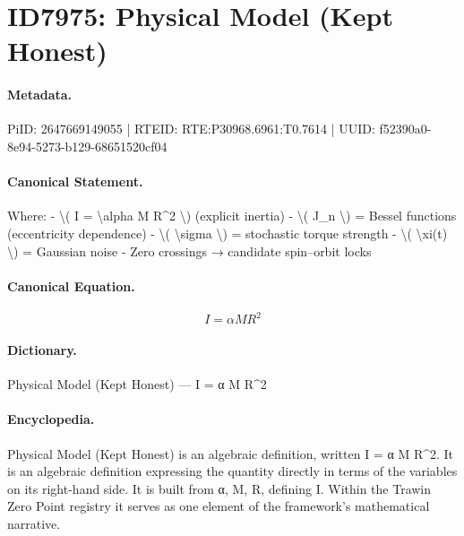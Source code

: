 \section*{ID7975: Physical Model (Kept Honest)}
\paragraph{Metadata.}
PiID: 2647669149055 | RTEID: RTE:P30968.6961:T0.7614 | UUID: f52390a0-8e94-5273-b129-68651520cf04

\paragraph{Canonical Statement.}
Where: - \textbackslash{}( I = \textbackslash{}alpha M R\textasciicircum{}2 \textbackslash{}) (explicit inertia) - \textbackslash{}( J\_n \textbackslash{}) = Bessel functions (eccentricity dependence) - \textbackslash{}( \textbackslash{}sigma \textbackslash{}) = stochastic torque strength - \textbackslash{}( \textbackslash{}xi(t) \textbackslash{}) = Gaussian noise - Zero crossings → candidate spin–orbit locks

\paragraph{Canonical Equation.}
\[
I = \alpha M R^2
\]

\paragraph{Dictionary.}
Physical Model (Kept Honest) — I = α M R\textasciicircum{}2

\paragraph{Encyclopedia.}
Physical Model (Kept Honest) is an algebraic definition, written I = α M R\textasciicircum{}2. It is an algebraic definition expressing the quantity directly in terms of the variables on its right-hand side. It is built from α, M, R, defining I. Within the Trawin Zero Point registry it serves as one element of the framework's mathematical narrative.
